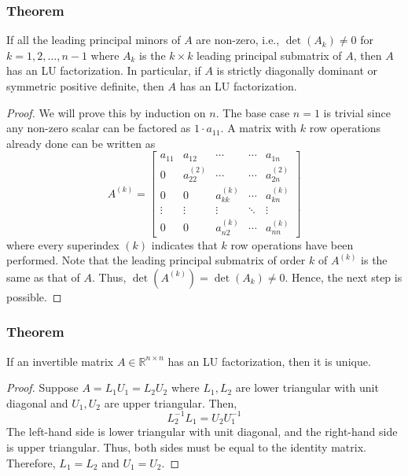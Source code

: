 \documentclass[11pt]{article}
\begin{document}
\subsubsection*{Theorem}
If all the leading principal minors of \(A\) are non-zero, i.e., \(\det(A_k) \neq 0\) for \(k = 1, 2, \ldots, n-1\) where \(A_k\) is the \(k \times k\) leading principal submatrix of \(A\), then \(A\) has an LU factorization. In particular, if \(A\) is strictly diagonally dominant or symmetric positive definite, then \(A\) has an LU factorization.

\begin{proof}
We will prove this by induction on \(n\). The base case \(n=1\) is trivial since any non-zero scalar can be factored as \(1 \cdot a_{11}\). A matrix with \(k\) row operations already done can be written as
\[A^{(k)} = \begin{bmatrix}
    a_{11} & a_{12} & \cdots & \cdots & a_{1n} \\
    0 & a_{22}^{(2)} & \cdots & \cdots & a_{2n}^{(2)} \\
    0 & 0 & a_{kk}^{(k)} & \cdots & a_{kn}^{(k)} \\
    \vdots & \vdots & \vdots & \ddots & \vdots \\
    0 & 0 & a_{n2}^{(k)} & \cdots & a_{nn}^{(k)}
\end{bmatrix}\]
where every superindex \((k)\) indicates that \(k\) row operations have been performed. Note that the leading principal submatrix of order \(k\) of \(A^{(k)}\) is the same as that of \(A\). Thus, \(\det(A^{(k)}) = \det(A_k) \neq 0\). 
Hence, the next step is possible.
\end{proof}

\subsubsection*{Theorem}
If an invertible matrix \(A \in \mathbb{R}^{n \times n}\) has an LU factorization, then it is unique.
\begin{proof}
Suppose \(A = L_1 U_1 = L_2 U_2\) where \(L_1, L_2\) are lower triangular with unit diagonal and \(U_1, U_2\) are upper triangular. Then,
\[L_2^{-1} L_1 = U_2 U_1^{-1}\]
The left-hand side is lower triangular with unit diagonal, and the right-hand side is upper triangular. Thus, both sides must be equal to the identity matrix. Therefore, \(L_1 = L_2\) and \(U_1 = U_2\).
\end{proof}
\end{document}
